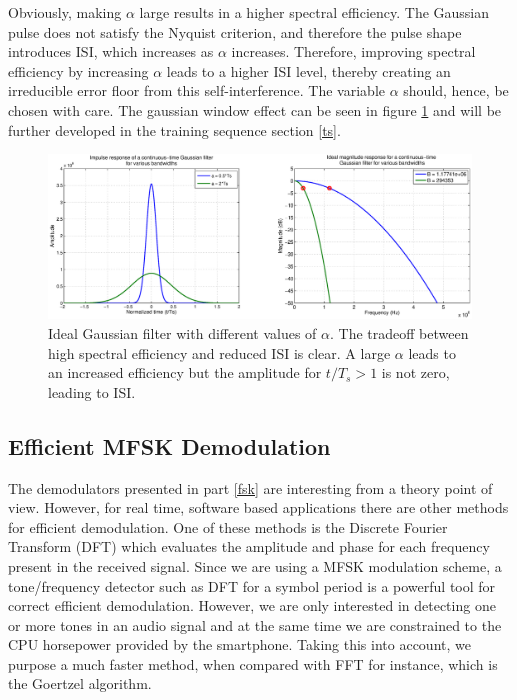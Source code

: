 \documentclass[12pt,a4paper,openright]{article}
\begin{document}
 Obviously, making $\alpha$ large results in a higher spectral efficiency. The Gaussian pulse does not satisfy the Nyquist criterion, and therefore the pulse shape introduces ISI, which increases as $\alpha$ increases. Therefore, improving spectral efficiency by increasing $\alpha$ leads to a higher ISI level, thereby creating an irreducible error floor from this self-interference. The variable $\alpha$ should, hence, be chosen with care. The gaussian window effect can be seen in figure \ref{gaussianalpha} and will be further developed in the training sequence section \ref{ts}.

 \begin{figure}[h]
  \centering
    \includegraphics[width=1\textwidth]{gausswinalpha.eps}
    \caption{Ideal Gaussian filter with different values of $\alpha$. The tradeoff between high spectral efficiency and reduced ISI is clear. A large $\alpha$ leads to an increased efficiency but the amplitude for $t/T_s > 1$ is not zero, leading to ISI.}
    \label{gaussianalpha}
\end{figure} 
 

\subsection{Efficient MFSK Demodulation}

The demodulators presented in part \ref{fsk} are interesting from a theory point of view. However, for real time, software based applications there are other methods for efficient demodulation. One of these methods is the Discrete Fourier Transform (DFT) which evaluates the amplitude and phase for each frequency present in the received signal. Since we are using a MFSK modulation scheme, a tone/frequency detector such as DFT for a symbol period is a powerful tool for correct efficient demodulation. However, we are only interested in detecting one or more tones in an audio signal and at the same time we are constrained to the CPU horsepower provided by the smartphone. Taking this into account, we purpose a much faster method, when compared with FFT for instance, which is the Goertzel algorithm. 
\end{document}
